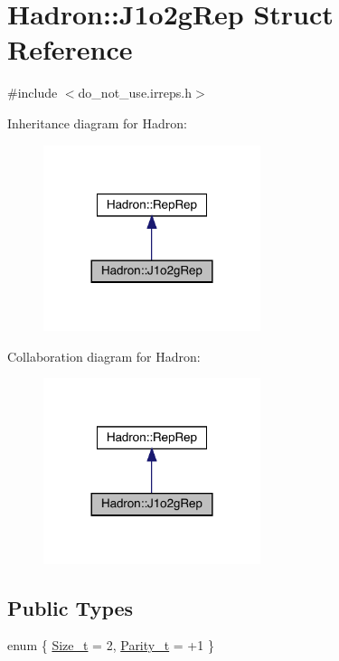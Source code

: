 \hypertarget{structHadron_1_1J1o2gRep}{}\section{Hadron\+:\+:J1o2g\+Rep Struct Reference}
\label{structHadron_1_1J1o2gRep}


{\ttfamily \#include $<$do\+\_\+not\+\_\+use.\+irreps.\+h$>$}



Inheritance diagram for Hadron\+:\nopagebreak
\begin{figure}[H]
\begin{center}
\leavevmode
\includegraphics[width=180pt]{df/dbb/structHadron_1_1J1o2gRep__inherit__graph}
\end{center}
\end{figure}


Collaboration diagram for Hadron\+:\nopagebreak
\begin{figure}[H]
\begin{center}
\leavevmode
\includegraphics[width=180pt]{d6/d45/structHadron_1_1J1o2gRep__coll__graph}
\end{center}
\end{figure}
\subsection*{Public Types}
\begin{DoxyCompactItemize}
\item 
enum \{ \mbox{\hyperlink{structHadron_1_1J1o2gRep_a87217d794c2e0351f09b30828493e0b8a0418e40559a710e157930559adb386bd}{Size\+\_\+t}} = 2, 
\mbox{\hyperlink{structHadron_1_1J1o2gRep_a87217d794c2e0351f09b30828493e0b8a6b7975f5353e9b71615efcef089db917}{Parity\+\_\+t}} = +1
 \}
\end{DoxyCompactItemize}
